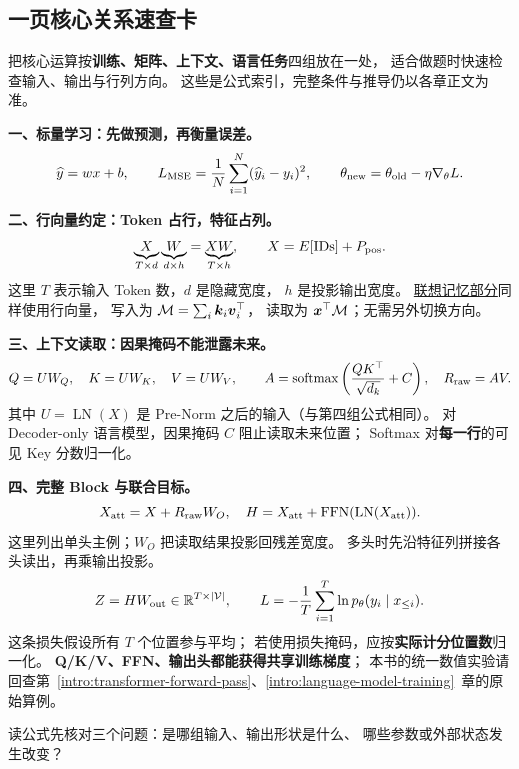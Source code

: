 \subsection{一页核心关系速查卡}
\label{app:core-formulas}

把核心运算按\textbf{训练、矩阵、上下文、语言任务}四组放在一处，
适合做题时快速检查输入、输出与行列方向。
这些是公式索引，完整条件与推导仍以各章正文为准。

\noindent\textbf{一、标量学习：先做预测，再衡量误差。}
\[
\widehat{y}=wx+b,\qquad
L_{\rm MSE}=\frac1N\sum_{i=1}^{N}(\widehat{y}_i-y_i)^2,
\qquad
\theta_{\rm new}=\theta_{\rm old}-\eta\nabla_\theta L.
\]

\noindent\textbf{二、行向量约定：Token 占行，特征占列。}
\[
\underbrace{X}_{T\times d}
\underbrace{W}_{d\times h}
=\underbrace{XW}_{T\times h},\qquad
X=E[\mathrm{IDs}]+P_{\rm pos}.
\]
这里 $T$ 表示输入 Token 数，$d$ 是隐藏宽度，
$h$ 是投影输出宽度。
\hyperref[intro:key-value-outer-product]{联想记忆部分}同样使用行向量，
写入为 $\mathcal{M}=\sum_i \boldsymbol{k}_i\boldsymbol{v}_i^\top$，
读取为 $\boldsymbol{x}^\top\mathcal{M}$；无需另外切换方向。

\noindent\textbf{三、上下文读取：因果掩码不能泄露未来。}
\[
Q=UW_Q,\quad K=UW_K,\quad V=UW_V,\qquad
A=\operatorname{softmax}\left(\frac{QK^\top}{\sqrt{d_k}}+C\right),
\quad R_{\rm raw}=AV.
\]
其中 $U=\operatorname{LN}(X)$ 是 Pre-Norm 之后的输入（与第四组公式相同）。
对 Decoder-only 语言模型，因果掩码 $C$ 阻止读取未来位置；
Softmax 对\textbf{每一行}的可见 Key 分数归一化。

\noindent\textbf{四、完整 Block 与联合目标。}
\[
X_{\rm att}=X+R_{\rm raw}W_O,
\quad
H=X_{\rm att}+\operatorname{FFN}(\operatorname{LN}(X_{\rm att})).
\]
这里列出单头主例；$W_O$ 把读取结果投影回残差宽度。
多头时先沿特征列拼接各头读出，再乘输出投影。
\[
Z=HW_{\rm out}\in\mathbb{R}^{T\times|\mathcal V|},
\qquad
L=-\frac1T\sum_{i=1}^{T}\ln p_\theta(y_i\mid x_{\le i}).
\]
这条损失假设所有 $T$ 个位置参与平均；
若使用损失掩码，应按\textbf{实际计分位置数}归一化。
\textbf{Q/K/V、FFN、输出头都能获得共享训练梯度}；
本书的统一数值实验请回查第~\ref*{intro:transformer-forward-pass}、\ref*{intro:language-model-training}~章的原始算例。

\par\smallskip
读公式先核对三个问题：是哪组输入、输出形状是什么、
哪些参数或外部状态发生改变？
